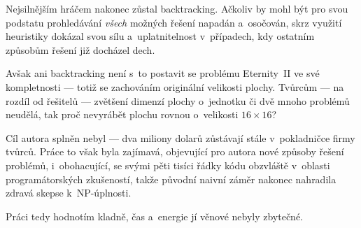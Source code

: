 \documentclass[11pt, titlepage]{report}
\begin{document}
Nejsilnějším hráčem nakonec zůstal backtracking. Ačkoliv by mohl být pro svou podstatu prohledávání \emph{všech} možných řešení napadán a~osočován, skrz využití heuristiky dokázal svou sílu a~uplatnitelnost v~případech, kdy ostatním způsobům řešení již docházel dech.

Avšak ani backtracking není s~to postavit se problému Eternity~II ve své kompletnosti --- totiž se zachováním originální velikosti plochy. Tvůrcům --- na rozdíl od řešitelů --- zvětšení dimenzí plochy o~jednotku či dvě mnoho problémů neudělá, tak proč nevyrábět plochu rovnou o~velikosti $16 \times 16$?

Cíl autora splněn nebyl --- dva miliony dolarů zůstávají stále v~pokladničce firmy tvůrců. Práce to však byla zajímavá, objevující pro autora nové způsoby řešení problémů, i~obohacující, se svými pěti tisíci řádky kódu obzvláště v~oblasti programátorských zkušeností, takže původní naivní záměr nakonec nahradila zdravá skepse k~NP-úplnosti.

Práci tedy hodnotím kladně, čas a~energie jí věnové nebyly zbytečné.


\renewcommand{\bibname}{\chapter{Literatura}\vspace*{-12mm}}
\end{document}

